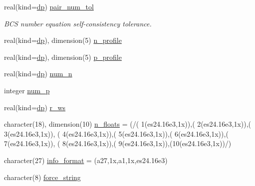 \begin{DoxyCompactItemize}
real(kind=\mbox{\hyperlink{namespaceparameters_a52f8c6351fd79345d8811e065bcbbb37}{dp}}) \mbox{\hyperlink{group__INPUT__PARS_gad39a7f1795d33065b388d6966d51e190}{pair\+\_\+num\+\_\+tol}}
\begin{DoxyCompactList}\small\item\em B\+CS number equation self-\/consistency tolerance. \end{DoxyCompactList}\item 
real(kind=\mbox{\hyperlink{namespaceparameters_a52f8c6351fd79345d8811e065bcbbb37}{dp}}), dimension(5) \mbox{\hyperlink{group__EXT__PROFILES_ga212100ee82dc6c5f66b280c3d3c59587}{n\+\_\+profile}}
\item 
real(kind=\mbox{\hyperlink{namespaceparameters_a52f8c6351fd79345d8811e065bcbbb37}{dp}}), dimension(5) \mbox{\hyperlink{group__EXT__PROFILES_gac33314b2e7b3b80461c26fff4b4f6a71}{p\+\_\+profile}}
\item 
real(kind=\mbox{\hyperlink{namespaceparameters_a52f8c6351fd79345d8811e065bcbbb37}{dp}}) \mbox{\hyperlink{group__EXT__PROFILES_ga9fdeb5df8ae40efefdff5ae559099b6e}{num\+\_\+n}}
\item 
integer \mbox{\hyperlink{group__EXT__PROFILES_ga25fb3b9dce82aa8bfe7e1f8e99d66edf}{num\+\_\+p}}
\item 
real(kind=\mbox{\hyperlink{namespaceparameters_a52f8c6351fd79345d8811e065bcbbb37}{dp}}) \mbox{\hyperlink{group__EXT__PROFILES_gadf4b1a873d7f2b95b72c0503f71462c4}{r\+\_\+ws}}
\item 
character(18), dimension(10) \mbox{\hyperlink{group__FORMATS_ga75e55b6ae9f977f08dcde5798efa2520}{n\+\_\+floats}} = (/\textquotesingle{}( 1(es24.\+16e3,1x))\textquotesingle{},\textquotesingle{}( 2(es24.\+16e3,1x))\textquotesingle{},\textquotesingle{}( 3(es24.\+16e3,1x))\textquotesingle{}, \textquotesingle{}( 4(es24.\+16e3,1x))\textquotesingle{},\textquotesingle{}( 5(es24.\+16e3,1x))\textquotesingle{},\textquotesingle{}( 6(es24.\+16e3,1x))\textquotesingle{},\textquotesingle{}( 7(es24.\+16e3,1x))\textquotesingle{}, \textquotesingle{}( 8(es24.\+16e3,1x))\textquotesingle{},\textquotesingle{}( 9(es24.\+16e3,1x))\textquotesingle{},\textquotesingle{}(10(es24.\+16e3,1x))\textquotesingle{}/)
\item 
character(27) \mbox{\hyperlink{group__FORMATS_ga1d71f88907da2dbb383e489d23cf1346}{info\+\_\+format}} = \textquotesingle{}(a27,1x,a1,1x,es24.\+16e3)\textquotesingle{}
\item 
character(8) \mbox{\hyperlink{group__STRINGS_gaf1698471c98154361a7783b3bd76fc9b}{force\+\_\+string}}
\item 

\end{DoxyCompactItemize}
